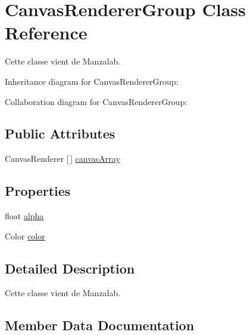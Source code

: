 \hypertarget{class_canvas_renderer_group}{}\section{Canvas\+Renderer\+Group Class Reference}
\label{class_canvas_renderer_group}


Cette classe vient de Manzalab.  




Inheritance diagram for Canvas\+Renderer\+Group\+:


Collaboration diagram for Canvas\+Renderer\+Group\+:
\subsection*{Public Attributes}
\begin{DoxyCompactItemize}
\item 
Canvas\+Renderer \mbox{[}$\,$\mbox{]} \hyperlink{class_canvas_renderer_group_a836d1c62efc60ae63c86190f05001c98}{canvas\+Array}
\end{DoxyCompactItemize}
\subsection*{Properties}
\begin{DoxyCompactItemize}
\item 
float \hyperlink{class_canvas_renderer_group_a2ada95b5b09338905ea9055956f678bd}{alpha}
\item 
Color \hyperlink{class_canvas_renderer_group_a86f450abaae48e258e55672f03a7c755}{color}
\end{DoxyCompactItemize}


\subsection{Detailed Description}
Cette classe vient de Manzalab. 



\subsection{Member Data Documentation}
\mbox{\label{class_canvas_renderer_group_a836d1c62efc60ae63c86190f05001c98}} 

